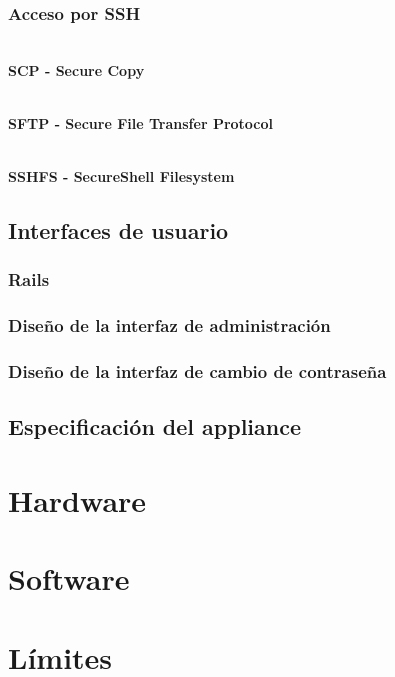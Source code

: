         \subsubsection {Acceso por SSH}



          \textbf{\\ SCP - Secure Copy \\}



          \textbf{\\ SFTP - Secure File Transfer Protocol \\}



          \textbf{\\ SSHFS - SecureShell Filesystem \\}



      \subsection {Interfaces de usuario}
        \subsubsection {Rails}
        \subsubsection {Dise\~{n}o de la interfaz de administraci\'{o}n}
        \subsubsection {Dise\~{n}o de la interfaz de cambio de contrase\~{n}a}
    \subsection {Especificaci\'{o}n del appliance}
      \section {Hardware}
      \section {Software}
      \section {L\'{i}mites}
